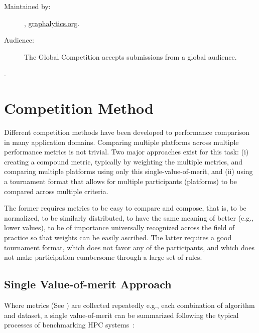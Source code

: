 \begin{description}
    \item[Maintained by:] \toolname, \url{graphalytics.org}.
    \item[Audience:] The Global \toolname{} Competition accepts submissions from a global audience.
\end{description} 



 .








\section{Competition Method} \label{sec:competitions}
Different competition methods have been developed to performance comparison in many application domains. Comparing multiple platforms across multiple performance metrics is not trivial. Two major approaches exist for this task: (i) creating a compound metric, typically by weighting the multiple metrics, and comparing multiple platforms using only this single-value-of-merit, and (ii) using a tournament format that allows for multiple participants (platforms) to be compared across multiple criteria. 

The former requires metrics to be easy to compare and compose, that is, to be normalized, to be similarly distributed, to have the same meaning of better (e.g., lower values), to be of importance universally recognized across the field of practice so that weights can be easily ascribed. The latter requires a good tournament format, which does not favor any of the participants, and which does not make participation cumbersome through a large set of rules.


\subsection{Single Value-of-merit Approach} \label{sec:competitions:single_value}
Where metrics (See ) are collected repeatedly e.g., each combination of algorithm and dataset, a single value-of-merit can be summarized following the typical processes of benchmarking HPC systems~\cite{DBLP:conf/sc/HoeflerB15}:

